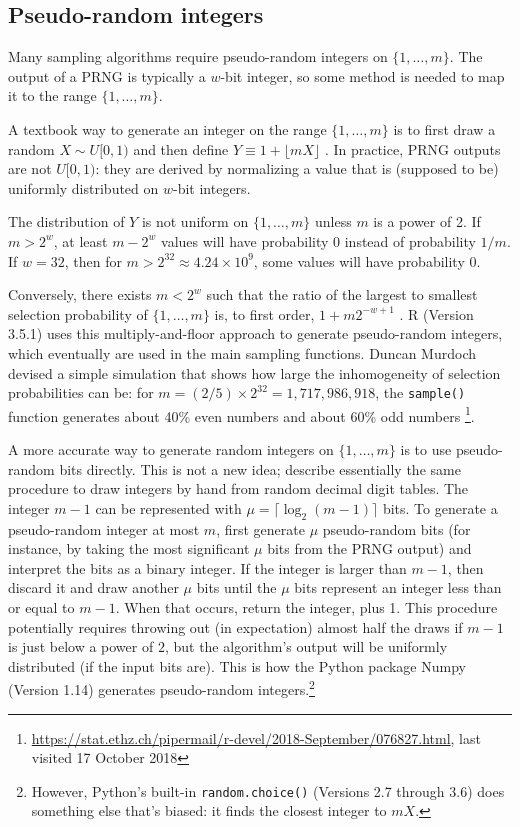 \documentclass[graybox]{svmult}
\begin{document}
\subsection{Pseudo-random integers}
\label{sec:integers}
Many sampling algorithms require pseudo-random integers on $\{1, \ldots, m\}$.
The output of a PRNG is typically a $w$-bit integer, so some method is needed to map it to the range $\{1, \ldots, m\}$.

A textbook way to generate an integer on the range $\{1, \ldots, m\}$ is to first draw a random $X \sim U[0,1)$
and then define $Y \equiv 1 + \lfloor mX \rfloor$ \cite{press_numerical_1988, peck_introduction_2011}. 
In practice, PRNG outputs are not $U[0,1)$: they are derived by normalizing a value that is
 (supposed to be) uniformly distributed on $w$-bit integers. 

The distribution of $Y$ is not uniform on $\{1, \ldots, m\}$ unless $m$ is a power of 2.
If $m > 2^w$, at least $m-2^w$ values will have probability 0 instead of probability $1/m$.
If $w=32$, then for $m>2^{32}\approx4.24 \times 10^9$, some values will have probability 0. 

Conversely, there exists $m < 2^w$ such that the ratio of the largest to smallest selection probability
of $\{1, \ldots, m\}$ is, to first order,  $1+ m 2^{-w+1}$ \cite{knuth_art_1997}.
R (Version 3.5.1) \cite{R_2018} uses this multiply-and-floor approach to generate 
pseudo-random integers,
which eventually are used in the main sampling functions.
Duncan Murdoch devised a simple simulation that shows how large the inhomogeneity of selection
probabilities can be:
for $m=  (2/5) \times 2^{32} = 1,717,986,918$, the \texttt{sample()} function generates about 40\% even numbers and about 60\% odd numbers \footnote{ %
\url{https://stat.ethz.ch/pipermail/r-devel/2018-September/076827.html}, last visited 17 October 2018
}. %
    
A more accurate way to generate random integers on $\{1, \dots, m\}$ is to use pseudo-random bits directly. 
This is not a new idea; \cite{hodges_basic_1970} describe essentially the same procedure to draw integers by hand
from random decimal digit tables.
The integer $m-1$ can be represented with $\mu = \lceil \log_2(m-1) \rceil$ bits. 
To generate a pseudo-random integer at most $m$, first generate $\mu$ pseudo-random bits (for instance, by taking the most significant $\mu$ bits from the PRNG output) and interpret the bits as a binary integer.  
If the integer is larger than $m-1$, then discard it and draw another $\mu$ bits until the $\mu$ bits represent an integer less than or equal to $m-1$.
When that occurs, return the integer, plus 1.
This procedure potentially requires throwing out (in expectation) almost half the draws if $m-1$ is 
just below a power of $2$, but the algorithm's output will be uniformly distributed (if the input bits are).
This is how the Python package Numpy (Version 1.14) generates pseudo-random integers.\footnote{
However, Python's built-in \texttt{random.choice()} (Versions 2.7 through 3.6) does something else that's biased: it finds the closest integer to $mX$.
}
\end{document}
